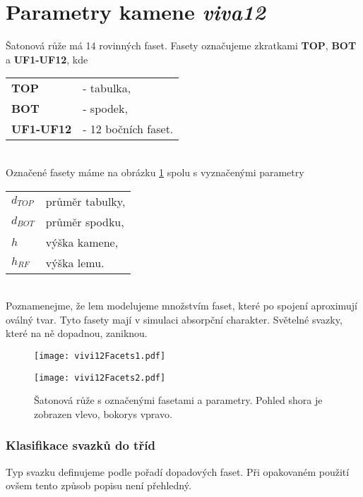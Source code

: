 \part{Parametry kamene \textit{viva12}}
\label{sec: parametryVIVA12}

Šatonová růže má 14 rovinných faset. Fasety označujeme zkratkami \textbf{TOP}, \textbf{BOT} a \textbf{UF1-UF12}, kde

\begin{tabular}{l l}
\textbf{TOP} & - tabulka,\\
\textbf{BOT} & - spodek,\\
\textbf{UF1-UF12} & - 12 bočních faset.\\
\end{tabular}\\

Označené fasety máme na obrázku \ref{fig:viva12Params} spolu s vyznačenými parametry

\begin{tabular}{l l}
$d_{TOP}$ & průměr tabulky,\\
$d_{BOT}$ & průměr spodku,\\
$h$ & výška kamene,\\
$h_{RF}$ & výška lemu. 
\end{tabular}\\
 
Poznamenejme, že lem modelujeme množstvím faset, které po spojení aproximují oválný tvar. Tyto fasety mají v simulaci absorpční charakter. Světelné svazky, které na ně dopadnou, zaniknou.   

\begin{figure}[htps]
\centering
\begin{minipage}[c]{0.4\textwidth}
\texttt{[image: vivi12Facets1.pdf]}
\end{minipage}
\begin{minipage}[c]{0.56\textwidth}
\texttt{[image: vivi12Facets2.pdf]}
\end{minipage}
\caption{Šatonová růže s označenými fasetami a parametry. Pohled shora je zobrazen vlevo, bokorys vpravo.}
\label{fig:viva12Params}
\end{figure}

\section{Klasifikace svazků do tříd}
Typ svazku definujeme podle pořadí dopadových faset. Při opakovaném použití ovšem tento způsob popisu není přehledný.

